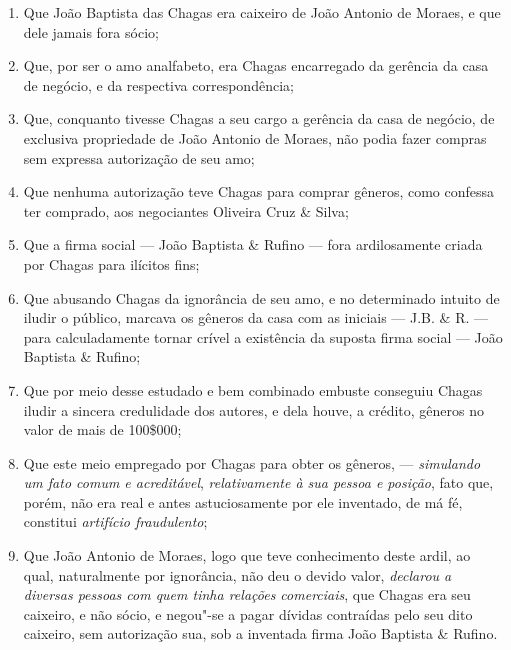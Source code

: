 \begin{enumerate}[label=\arabic*º]
\item Que João Baptista das Chagas era caixeiro de João Antonio de Moraes,
e que dele jamais fora sócio;

\item Que, por ser o amo analfabeto, era Chagas encarregado da gerência da
casa de negócio, e da respectiva correspondência;

\item Que, conquanto tivesse Chagas a seu cargo a gerência da casa de
negócio, de exclusiva propriedade de João Antonio de Moraes, não podia
fazer compras sem expressa autorização de seu amo;

\item Que nenhuma autorização teve Chagas para comprar gêneros, como
confessa ter comprado, aos negociantes Oliveira Cruz \& Silva;

\item Que a firma social --- João Baptista \& Rufino --- fora ardilosamente
criada por Chagas para ilícitos fins;

\item Que abusando Chagas da ignorância de seu amo, e no determinado
intuito de iludir o público, marcava os gêneros da casa com as iniciais
--- J.B. \& R. --- para calculadamente tornar crível a existência da suposta
firma social --- João Baptista \& Rufino;

\item Que por meio desse estudado e bem combinado embuste conseguiu Chagas
iludir a sincera credulidade dos autores, e dela houve, a crédito,
gêneros no valor de mais de 100\$000;

\item Que este meio empregado por Chagas para obter os gêneros, ---
\emph{simulando um fato comum e acreditável}, \emph{relativamente à sua
pessoa e posição}, fato que, porém, não era real e antes astuciosamente
por ele inventado, de má fé, constitui \emph{artifício fraudulento};

\item Que João Antonio de Moraes, logo que teve conhecimento deste ardil,
ao qual, naturalmente por ignorância, não deu o devido valor,
\emph{declarou a diversas pessoas com quem tinha relações comerciais},
que Chagas era seu caixeiro, e não sócio, e negou"-se a pagar dívidas
contraídas pelo seu dito caixeiro, sem autorização sua, sob a inventada
firma João Baptista \& Rufino.
\end{enumerate}

